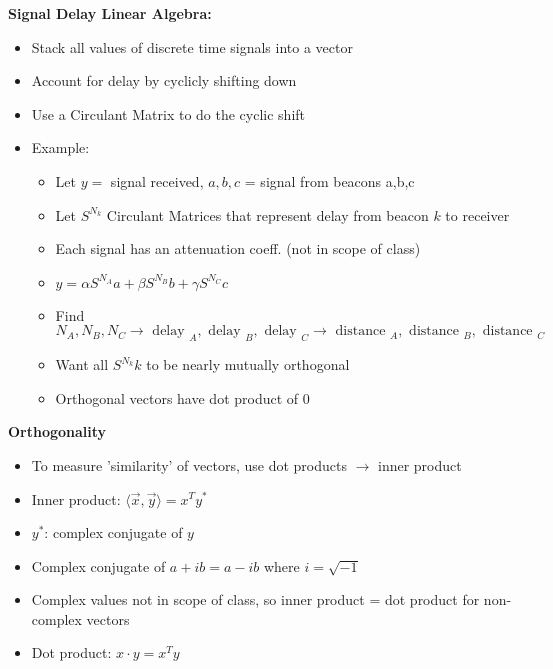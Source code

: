 \documentclass{article}\usepackage{amsmath,amssymb,amsthm,tikz,tkz-graph,color,chngpage,soul,hyperref,csquotes,graphicx,floatrow}\newcommand*{\QEDB}{\hfill\ensuremath{\square}}\newtheorem*{prop}{Proposition}\renewcommand{\theenumi}{\alph{enumi}}\usepackage[shortlabels]{enumitem}\usepackage[nobreak=true]{mdframed}\usetikzlibrary{matrix,calc}\MakeOuterQuote{"}\usepackage[margin=0.75in]{geometry} \newtheorem{theorem}{Theorem}\newcommand{\Z}{\mathbb Z}\newcommand{\R}{\mathbb R}\newcommand{\Q}{\mathbb Q}\newcommand{\N}{\mathbb N}\newcommand{\x}[1]{\textrm{ #1 }}\newcommand{\pr}{\textrm{Pr}}
\begin{document}
\begin{mdframed}
\textbf{Signal Delay Linear Algebra:}
\begin{itemize}
    \item Stack all values of discrete time signals into a vector
    \item Account for delay by cyclicly shifting down
    \item Use a Circulant Matrix to do the cyclic shift
    \item Example:
    \begin{itemize}
        \item Let $y =$ signal received, $a,b,c$ = signal from beacons a,b,c
        \item Let $S^{N_k}$ Circulant Matrices that represent delay from beacon $k$ to receiver
        \item Each signal has an attenuation coeff. (not in scope of class)
        \item $y = \alpha S^{N_A}a + \beta S^{N_B}b + \gamma S^{N_C}c$
        \item Find ${N_A},{N_B},{N_C} \rightarrow \x{delay}_A,\x{delay}_B,\x{delay}_C \rightarrow \x{distance}_A,\x{distance}_B,\x{distance}_C$
        \item Want all $S^{N_k}k$ to be nearly mutually orthogonal
        \item Orthogonal vectors have dot product of 0
    \end{itemize}
\end{itemize}
\end{mdframed}
\textbf{Orthogonality}
\begin{itemize}
    \item To measure 'similarity' of vectors, use dot products $\rightarrow$ inner product
    \item Inner product: $\langle\vec{x},\vec{y}\rangle=x^Ty^*$
    \item $y^*$: complex conjugate of $y$
    \item Complex conjugate of $a+ib = a-ib$ where $i = \sqrt{-1}$
    \item Complex values not in scope of class, so inner product = dot product for non-complex vectors
    \item Dot product: $x \cdot y=x^Ty$
\end{itemize}
\end{document}
